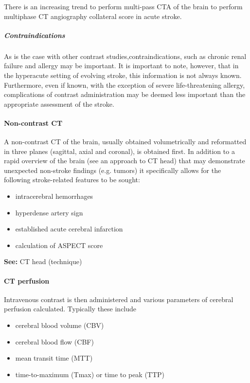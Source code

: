 There is an increasing trend to perform multi-pass CTA of the brain to perform multiphase CT angiography collateral score in acute stroke.

\subparagraph{Contraindications}

As is the case with other contrast studies,contraindications, such as chronic renal failure and allergy may be important. It is important to note, however, that in the hyperacute setting of evolving stroke, this information is not always known. Furthermore, even if known, with the exception of severe life-threatening allergy, complications of contrast administration may be deemed less important than the appropriate assessment of the stroke.

\paragraph{Non-contrast CT}

A non-contrast CT of the brain, usually obtained volumetrically and reformatted in three planes (sagittal, axial and coronal), is obtained first. In addition to a rapid overview of the brain (see an approach to CT head) that may demonstrate unexpected non-stroke findings (e.g. tumors) it specifically allows for the following stroke-related features to be sought:

\begin{itemize}
	\item
	intracerebral hemorrhages
	\item
	hyperdense artery sign
	\item
	established acute cerebral infarction
	\item
	calculation of ASPECT score
\end{itemize}

\textbf{See:} CT head (technique)

\paragraph{CT perfusion}

Intravenous contrast is then administered and various parameters of cerebral perfusion calculated. Typically these include

\begin{itemize}
	\item
	cerebral blood volume (CBV)
	\item
	cerebral blood flow (CBF)
	\item
	mean transit time (MTT)
	\item
	time-to-maximum (Tmax) or time to peak (TTP)
\end{itemize}


